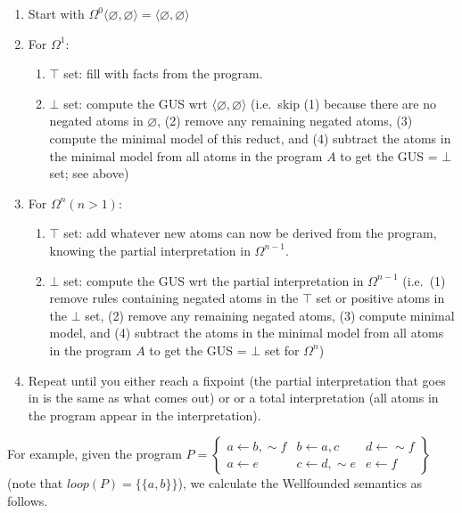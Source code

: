 \documentclass[9pt,a4paper,landscape]{article}
\begin{document}
{\begin{enumerate}[noitemsep]
	\item Start with $\Omega^0 \langle \varnothing, \varnothing \rangle = \langle \varnothing, \varnothing \rangle$
	\item For $\Omega^1$:
	\begin{enumerate}[noitemsep]
		\item $\top$ set: fill with facts from the program.
		\item $\bot$ set: compute the GUS wrt $\langle \varnothing, \varnothing \rangle$ (i.e.\ skip (1) because there are no negated atoms in $\varnothing$, (2) remove any remaining negated atoms, (3) compute the minimal model of this reduct, and (4) subtract the atoms in the minimal model from all atoms in the program $A$ to get the GUS = $\bot$ set; see above)
	\end{enumerate}
	\item For $\Omega^n (n>1)$:
	\begin{enumerate}[noitemsep]
		\item $\top$ set: add whatever new atoms can now be derived from the program, knowing the partial interpretation in $\Omega^{n-1}$.
		\item $\bot$ set: compute the GUS wrt the partial interpretation in $\Omega^{n-1}$ (i.e.\ (1) remove rules containing negated atoms in the $\top$ set or positive atoms in the $\bot$ set, (2) remove any remaining negated atoms, (3) compute minimal model, and (4) subtract the atoms in the minimal model from all atoms in the program $A$ to get the GUS = $\bot$ set for  $\Omega^{n}$)
	\end{enumerate}	
	\item Repeat until you either reach a fixpoint (the partial interpretation that goes in is the same as what comes out) or or a total interpretation (all atoms in the program appear in the interpretation).
\end{enumerate}

\pagebreak

For example, given the program $P = \left\{\begin{array}{lll}
a \leftarrow b, {\sim} f & b \leftarrow a, c & d \leftarrow {\sim} f\\
a \leftarrow e & c \leftarrow d, {\sim} e & e \leftarrow f
\end{array}\right\}$ (note that $loop(P) = \{ \{a, b \} \}$), we calculate the Wellfounded semantics as follows.

}
\end{document}
